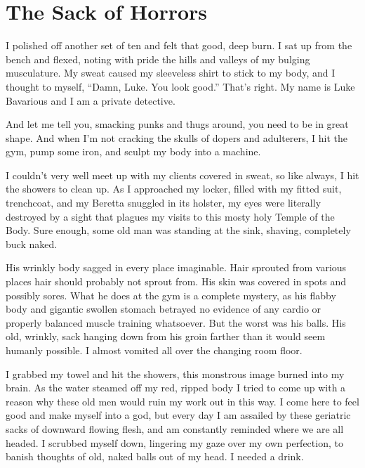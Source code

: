 \chapter{The Sack of Horrors}


I polished off another set of ten and felt that good, deep burn. I
sat up from the bench and flexed, noting with pride the hills and
valleys of my bulging musculature. My sweat caused my sleeveless
shirt to stick to my body, and I thought to myself, ``Damn, Luke.
You look good.'' That's right. My name is Luke Bavarious and I am a
private detective.



And let me tell you, smacking punks and thugs around, you need to
be in great shape. And when I'm not cracking the skulls of dopers
and adulterers, I hit the gym, pump some iron, and sculpt my body
into a machine.



I couldn't very well meet up with my clients covered in sweat, so
like always, I hit the showers to clean up. As I approached my
locker, filled with my fitted suit, trenchcoat, and my Beretta
snuggled in its holster, my eyes were literally destroyed by a
sight that plagues my visits to this mosty holy Temple of the Body.
Sure enough, some old man was standing at the sink, shaving,
completely buck naked.



His wrinkly body sagged in every place imaginable. Hair sprouted
from various places hair should probably not sprout from. His skin
was covered in spots and possibly sores. What he does at the gym is
a complete mystery, as his flabby body and gigantic swollen stomach
betrayed no evidence of any cardio or properly balanced muscle
training whatsoever. But the worst was his balls. His old, wrinkly,
sack hanging down from his groin farther than it would seem humanly
possible. I almost vomited all over the changing room floor.



I grabbed my towel and hit the showers, this monstrous image burned
into my brain. As the water steamed off my red, ripped body I tried
to come up with a reason why these old men would ruin my work out
in this way. I come here to feel good and make myself into a god,
but every day I am assailed by these geriatric sacks of downward
flowing flesh, and am constantly reminded where we are all headed.
I scrubbed myself down, lingering my gaze over my own perfection,
to banish thoughts of old, naked balls out of my head. I needed a
drink.



